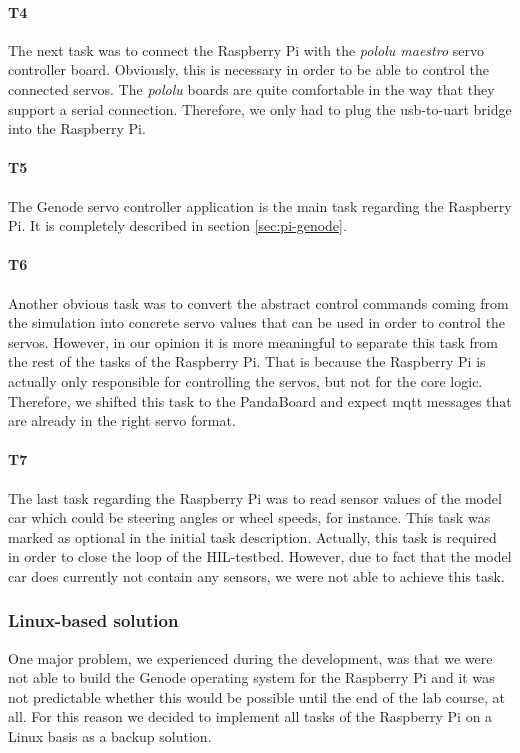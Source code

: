 \paragraph{\textbf{T4}} The next task was to connect the Raspberry Pi with the \textit{pololu maestro} servo controller board. Obviously, this is necessary in order to be able to control the connected servos. The \textit{pololu} boards are quite comfortable in the way that they support a serial connection. Therefore, we only had to plug the usb-to-uart bridge into the Raspberry Pi.

\paragraph{\textbf{T5}} The Genode servo controller application is the main task regarding the Raspberry Pi. It is completely described in section \ref{sec:pi-genode}.

\paragraph{\textbf{T6}} Another obvious task was to convert the abstract control commands coming from the simulation into concrete servo values that can be used in order to control the servos. However, in our opinion it is more meaningful to separate this task from the rest of the tasks of the Raspberry Pi. That is because the Raspberry Pi is actually only responsible for controlling the servos, but not for the core logic. Therefore, we shifted this task to the PandaBoard and expect mqtt messages that are already in the right servo format. 

\paragraph{\textbf{T7}} The last task regarding the Raspberry Pi was to read sensor values of the model car which could be steering angles or wheel speeds, for instance. This task was marked as optional in the initial task description. Actually, this task is required in order to close the loop of the HIL-testbed. However, due to fact that the model car does currently not contain any sensors, we were not able to achieve this task.


\subsubsection{Linux-based solution}
\label{sec:pi-linux}
One major problem, we experienced during the development, was that we were not able to build the Genode operating system for the Raspberry Pi and it was not predictable whether this would be possible until the end of the lab course, at all. For this reason we decided to implement all tasks of the Raspberry Pi on a Linux basis as a backup solution. \\

